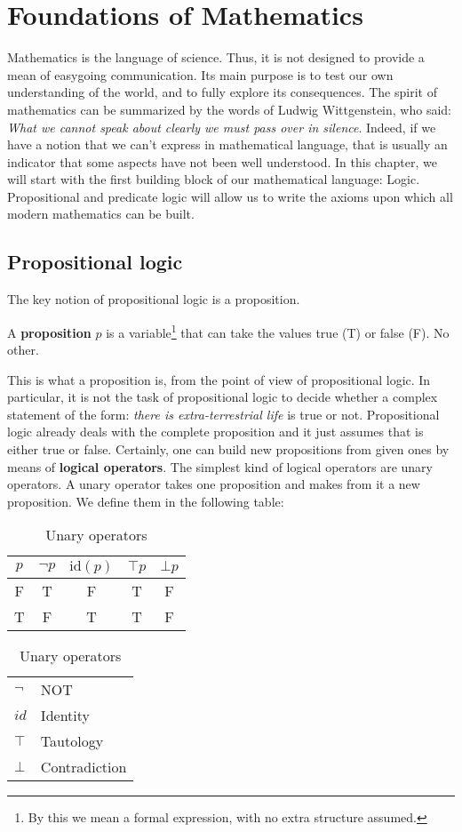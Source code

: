 \documentclass[root.tex]{subfiles}
\begin{document}
\chapter{Foundations of Mathematics}
Mathematics is the language of science. Thus, it is not designed to provide a mean of easygoing communication. Its main purpose is to test our own understanding of the world, and to fully explore its consequences. The spirit of mathematics can be summarized by the words of Ludwig Wittgenstein, who said: \emph{What we cannot speak about clearly we must pass over in silence}. Indeed, if we have a notion that we can't express in mathematical language, that is usually an indicator that some aspects have not been well understood. In this chapter, we will start with the first building block of our mathematical language: Logic. Propositional and predicate logic will allow us to write the axioms upon which all modern mathematics can be built. 

\section{Propositional logic}%
The key notion of propositional logic is a proposition. 
\begin{mydef}
  A \textbf{proposition} $p$ is a variable\footnote{By this we mean a formal expression, with no extra structure assumed.} that can take the values true (T) or false (F). No other. 
\end{mydef}
This is what a proposition is, from the point of view of propositional logic. In particular, it is not the task of propositional logic to decide whether a complex statement of the form: \emph{there is extra-terrestrial life} is true or not. Propositional logic already deals with the complete proposition and it just assumes that is either true or false. Certainly, one can build new propositions from given ones by means of \textbf{logical operators}. The simplest kind of logical operators are unary operators. A unary operator takes one proposition and makes from it a new proposition. We define them in the following table:
    \begin{table}[h]
      \centering
      \begin{tabular}{c||c|c|c|c}
        $p$ & $\neg p$ & $\mathrm{id}(p)$ & $\top p$ & $\bot p$ \\
        \hline
        \rule{0pt}{12pt} F & T & F & T & F\\
                         T & F & T & T & F
      \end{tabular}\qquad
      \begin{tabular}{ll}
        $\neg$ & NOT\\
        $id$   & Identity\\
        $\top$ & Tautology\\
        $\bot$ & Contradiction
      \end{tabular}
      \caption{Unary operators}
    \end{table}
\end{document}
